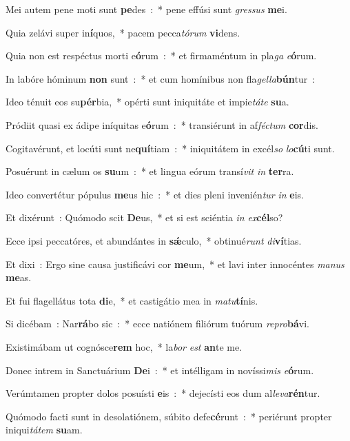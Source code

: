 ﻿\item Mei autem pene moti sunt \textbf{pe}des~:~* pene effúsi sunt \emph{gres}\emph{sus} \textbf{me}i.
\item Quia zelávi super in\textbf{í}quos,~* pacem pecca\emph{tó}\emph{rum} \textbf{vi}dens.
\item Quia non est respéctus morti e\textbf{ó}rum~:~* et firmaméntum in pla\emph{ga} \emph{e}\textbf{ó}rum.
\item In labóre hóminum \textbf{non} sunt~:~* et cum homínibus non fla\emph{gel}\emph{la}\textbf{bún}tur~:
\item Ideo ténuit eos su\textbf{pér}bia,~* opérti sunt iniquitáte et impie\emph{tá}\emph{te} \textbf{su}a.
\item Pródiit quasi ex ádipe iníquitas e\textbf{ó}rum~:~* transiérunt in af\emph{fé}\emph{ctum} \textbf{cor}dis.
\item Cogitavérunt, et locúti sunt ne\textbf{quí}tiam~:~* iniquitátem in excél\emph{so} \emph{lo}\textbf{cú}ti sunt.
\item Posuérunt in cælum os \textbf{su}um~:~* et lingua eórum transí\emph{vit} \emph{in} \textbf{ter}ra.
\item Ideo convertétur pópulus \textbf{me}us hic~:~* et dies pleni invenién\emph{tur} \emph{in} \textbf{e}is.
\item Et dixérunt~: Quómodo scit \textbf{De}us,~* et si est sciéntia \emph{in} \emph{ex}\textbf{cél}so?
\item Ecce ipsi peccatóres, et abundántes in \textbf{sǽ}culo,~* obtinué\emph{runt} \emph{di}\textbf{ví}tias.
\item Et dixi~: Ergo sine causa justificávi cor \textbf{me}um,~* et lavi inter innocéntes \emph{ma}\emph{nus} \textbf{me}as.
\item Et fui flagellátus tota \textbf{di}e,~* et castigátio mea in \emph{ma}\emph{tu}\textbf{tí}nis.
\item Si dicébam~: Nar\textbf{rá}bo sic~:~* ecce natiónem filiórum tuórum \emph{re}\emph{pro}\textbf{bá}vi.
\item Existimábam ut cognósce\textbf{rem} hoc,~* la\emph{bor} \emph{est} \textbf{an}te me.
\item Donec intrem in Sanctuárium \textbf{De}i~:~* et intélligam in novíssi\emph{mis} \emph{e}\textbf{ó}rum.
\item Verúmtamen propter dolos posuísti \textbf{e}is~:~* dejecísti eos dum al\emph{le}\emph{va}\textbf{rén}tur.
\item Quómodo facti sunt in desolatiónem, súbito defe\textbf{cé}runt~:~* periérunt propter iniqui\emph{tá}\emph{tem} \textbf{su}am.
